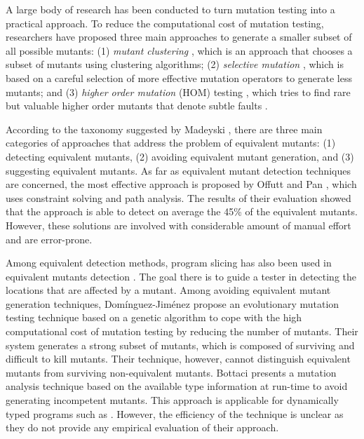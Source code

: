  A large body of research has been conducted to turn mutation testing into a practical approach.
To reduce the computational cost of  mutation testing, researchers have
proposed three main approaches to generate a smaller subset of all possible mutants: 
(1) \emph{mutant clustering} \cite{ji:seke09}, which is an approach that chooses a subset of
mutants using clustering algorithms; (2) \emph{selective mutation} \cite{barbosa:stvr01, siami:icse08, zhang:icse10}, which is based on a  
careful selection of more effective mutation operators to generate less mutants; and (3) \emph{higher order mutation} (HOM) testing \cite{jia:scam08}, which tries to find 
rare but valuable higher order mutants that denote subtle faults \cite{jia:tse10}.  

According to the taxonomy suggested by Madeyski \etal \cite{madeyski:tse13}, there are three main categories of approaches that address the problem of equivalent mutants: (1) detecting equivalent mutants, (2) avoiding equivalent mutant generation, and (3) suggesting equivalent mutants. As far as equivalent mutant detection techniques are concerned, the most effective approach is proposed by
Offutt and Pan \cite{offutt:tvr97, offutt:compass96}, which uses constraint
solving and path analysis. The results of their evaluation showed that the approach is able to detect on average the 45\% of the equivalent mutants. 
However, these solutions are involved with considerable amount of manual effort and are error-prone.

Among equivalent detection methods, program slicing has also been used in equivalent mutants detection \cite{hieron:tvr99}. %
The goal there is to guide a tester in detecting the locations that are affected by a mutant.
Among avoiding equivalent mutant generation techniques, Dom\'inguez-Jim\'enez \etal \cite{dominguez:ist11} propose an evolutionary mutation testing
technique based on a genetic algorithm to cope with the high computational cost of mutation 
testing by reducing the number of mutants. Their system generates a strong subset
of mutants, which is composed of surviving and difficult to kill mutants. 
Their technique, however, cannot distinguish equivalent mutants from surviving non-equivalent mutants.
Bottaci \cite{bottaci:icstw10} presents a mutation analysis technique based on the available type information at run-time to avoid generating incompetent mutants. 
This approach is applicable for dynamically typed programs such as \javascript. 
However, the efficiency of the technique is unclear as they do not provide any empirical evaluation of their approach. 

